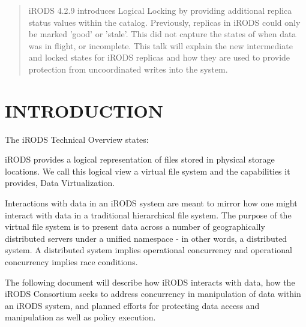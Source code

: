 \documentclass{irodsugm}
\begin{document}

\date{11 June 2021}

\maketitle

\begin{abstract}
iRODS 4.2.9 introduces Logical Locking by providing additional replica status values within the catalog. Previously, replicas in iRODS could only be marked 'good' or 'stale'. This did not capture the states of when data was in flight, or incomplete. This talk will explain the new intermediate and locked states for iRODS replicas and how they are used to provide protection from uncoordinated writes into the system.
\end{abstract}



\section*{INTRODUCTION}

The iRODS Technical Overview\cite{technicaloverview} states:

\begin{displayquote}
iRODS provides a logical representation of files stored in physical storage locations. We call this logical view a virtual file system and the capabilities it provides, Data Virtualization.
\end{displayquote}

Interactions with data in an iRODS system are meant to mirror how one might interact with data in a traditional hierarchical file system. The purpose of the virtual file system is to present data across a number of geographically distributed servers under a unified namespace - in other words, a distributed system. A distributed system implies operational concurrency and operational concurrency implies race conditions.

The following document will describe how iRODS interacts with data, how the iRODS Consortium seeks to address concurrency in manipulation of data within an iRODS system, and planned efforts for protecting data access and manipulation as well as policy execution.
\end{document}
